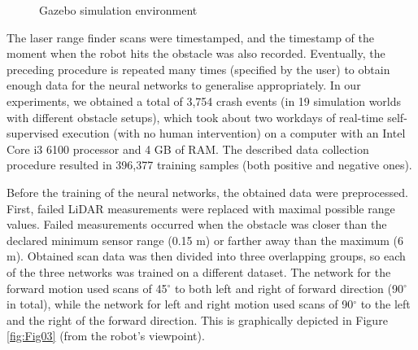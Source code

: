 \begin{figure}
    \centering
    \vfill
    \caption{Gazebo simulation environment}
    \label{fig:Fig02}
\end{figure}

The laser range finder scans were timestamped, and the timestamp of the moment when the robot hits the obstacle was also recorded. Eventually, the preceding procedure is repeated many times (specified by the user) to obtain enough data for the neural networks to generalise appropriately. In our experiments, we obtained a total of 3,754 crash events (in 19 simulation worlds with different obstacle setups), which took about two workdays of real-time self-supervised execution (with no human intervention) on a computer with an Intel Core i3 6100 processor and 4 GB of RAM. The described data collection procedure resulted in 396,377 training samples (both positive and negative ones).

Before the training of the neural networks, the obtained data were preprocessed. First, failed LiDAR measurements were replaced with maximal possible range values. Failed measurements occurred when the obstacle was closer than the declared minimum sensor range (0.15 m) or farther away than the maximum (6 m). Obtained scan data was then divided into three overlapping groups, so each of the three networks was trained on a different dataset. The network for the forward motion used scans of 45$^{\circ}$ to both left and right of forward direction (90$^{\circ}$ in total), while the network for left and right motion used scans of 90$^{\circ}$ to the left and the right of the forward direction. This is graphically depicted in Figure \ref{fig:Fig03} (from the robot's viewpoint).

